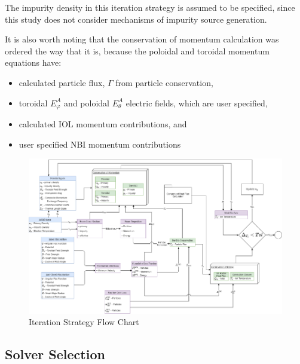 The impurity density in this iteration strategy is assumed to be specified, since this study does not consider mechanisms of impurity source generation.

It is also worth noting that the conservation of momentum calculation was ordered the way that it is, because the poloidal and toroidal momentum equations have:
\begin{itemize}
	\item calculated particle flux, $\Gamma$ from particle conservation, 
	\item toroidal $E_\varphi^A$ and poloidal $E_\theta^A$ electric fields, which are user specified,
	\item calculated \ac{IOL} momentum contributions, and
	\item user specified \ac{NBI} momentum contributions
\end{itemize}

\begin{figure}
	\centering
	\includegraphics[width=\textwidth]{images/IterationFlowChart}
	\caption[Flow Chart]{Iteration Strategy Flow Chart}
	\label{fig:flowchart}
\end{figure}

\subsection{Solver Selection} \label{sub:SolverSelection}


